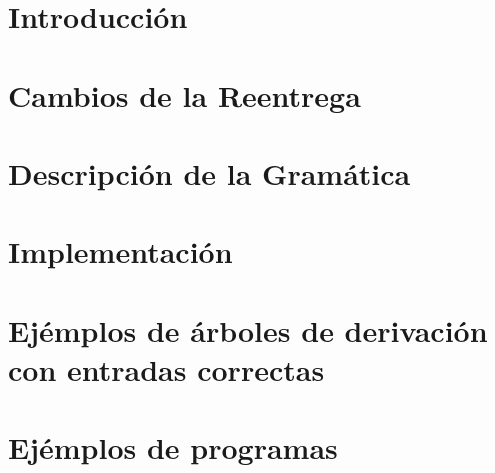 \documentclass[10pt, a4paper]{article}
\begin{document}
	\maketitle
	\tableofcontents
	
	\newpage
	\section{Introducci\'on}
	
	
	\section{Cambios de la Reentrega}
	
	
	\newpage
	\section{Descripción de la Gramática}
	
	
%	
	
	\newpage
	\section{Implementaci\'on}
	
	
	\newpage
	\section{Ej\'emplos de \'arboles de derivaci\'on con entradas correctas}
	
	
	
	\newpage
	\section{Ej\'emplos de programas}
	
	
	
	
\end{document}
